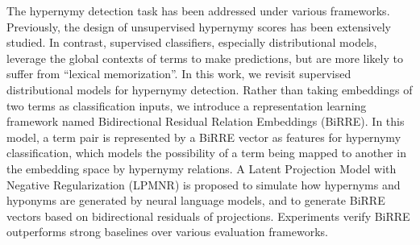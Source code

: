 The hypernymy detection task has been addressed under various frameworks. Previously, the design of unsupervised hypernymy scores has been extensively studied. In contrast, supervised classifiers, especially distributional models, leverage the global contexts of terms to make predictions, but are more likely to suffer from ``lexical memorization''. In this work, we revisit supervised distributional models for hypernymy detection. Rather than taking embeddings of two terms as classification inputs, we introduce a representation learning framework named Bidirectional Residual Relation Embeddings (BiRRE). In this model, a term pair is represented by a BiRRE vector as features for hypernymy classification, which models the possibility of a term being mapped to another in the embedding space by hypernymy relations. A Latent Projection Model with Negative Regularization (LPMNR) is proposed to simulate how hypernyms and hyponyms are generated by neural language models, and to generate BiRRE vectors based on bidirectional residuals of projections. Experiments verify BiRRE outperforms strong baselines over various evaluation frameworks.
